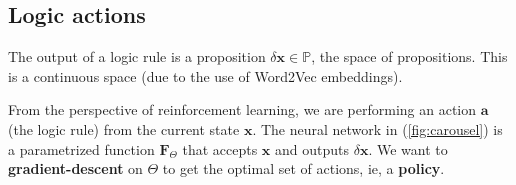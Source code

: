 \documentclass[orivec]{llncs}
\newcommand{\vect}[1]{\boldsymbol{#1}}
\begin{document}

\subsection{Logic actions}
\label{sec:logic-actions}

The output of a logic rule is a proposition $\delta \vect{x} \in \mathbb{P}$, the space of propositions.  This is a continuous space (due to the use of Word2Vec embeddings).

From the perspective of reinforcement learning, we are performing an action $\vect{a}$ (the logic rule) from the current state $\vect{x}$.  The neural network in (\ref{fig:carousel}) is a parametrized function $\vect{F}_{\Theta}$ that accepts $\vect{x}$ and outputs $\delta \vect{x}$.  We want to \textbf{gradient-descent} on $\Theta$ to get the optimal set of actions, ie, a \textbf{policy}.
\end{document}
